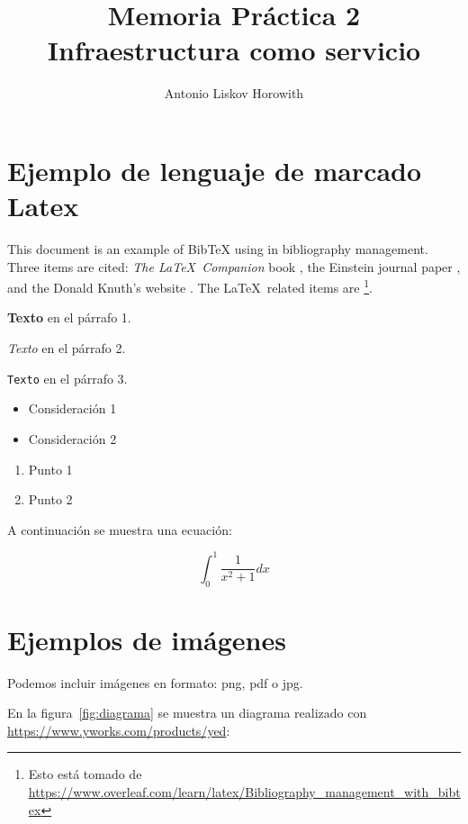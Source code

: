 \documentclass[twoside,spanish,a4paper,12pt]{cls/twcam-entregable}
\title{Memoria Práctica 2\\[2mm] Infraestructura como servicio}
\author{Antonio Liskov Horowith}
\begin{document}
\maketitle

\tableofcontents


\section{Ejemplo de lenguaje de marcado Latex}


This document is an example of BibTeX using in bibliography management. Three items
are cited: \textit{The \LaTeX\ Companion} book \cite{latexcompanion}, the Einstein
journal paper \cite{einstein}, and the Donald Knuth's website \cite{knuthwebsite}.
The \LaTeX\ related items are \cite{latexcompanion,knuthwebsite}\footnote{Esto está tomado de
\url{https://www.overleaf.com/learn/latex/Bibliography_management_with_bibtex}}.



\textbf{Texto} en el párrafo 1.

\textit{Texto} en el párrafo 2.

\texttt{Texto} en el párrafo 3.

  \begin{itemize}
  \item Consideración 1
  \item Consideración 2
  \end{itemize}

  \vspace{0.5cm}

  \begin{enumerate}
  \item Punto 1
  \item Punto 2
  \end{enumerate}

A continuación se muestra una ecuación:

  \[ \int_{0}^{1}\frac{1}{x^2+1} dx \]

\section{Ejemplos de imágenes}

  Podemos incluir imágenes en formato: png, pdf o jpg.

  En la figura~\ref{fig:diagrama} se muestra un diagrama realizado con \href{yed}{https://www.yworks.com/products/yed}:
\end{document}
